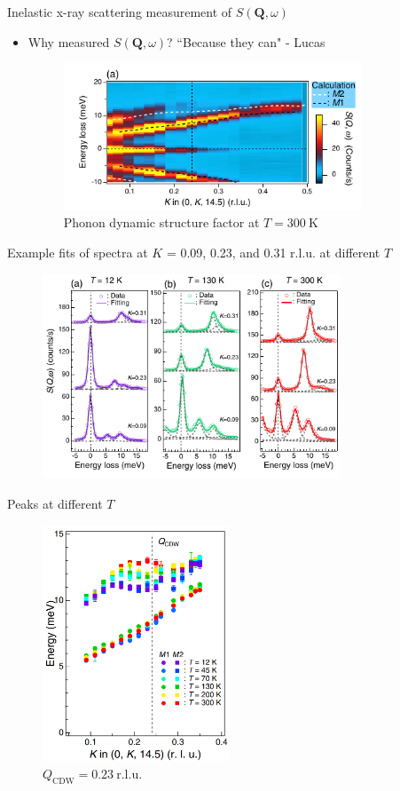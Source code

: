 \documentclass{beamer}
\newcommand*\vf[1]{\mathbf{#1}}
\begin{document}
\begin{frame}{Inelastic x-ray scattering measurement of $S(\vf{Q}, \omega)$}
\begin{itemize}
\item Why measured $S(\vf{Q}, \omega)$? ``Because they can" - Lucas
\begin{figure}
\includegraphics[width=3.5in]{figs/exp_sq.pdf}
\caption{\label{fig:exp_sq} Phonon dynamic structure factor at $T = 300~\mathrm{K}$}
\end{figure}
\end{itemize}
\end{frame}

\begin{frame}{Example fits of spectra at $K$ = 0.09, 0.23, and 0.31 r.l.u. at different $T$}
\begin{figure}
\includegraphics[width=3.5in]{figs/exp_fit.pdf}
\caption{\label{fig:exp_fit} }
\end{figure}
\end{frame}

\begin{frame}{Peaks at different $T$}
\begin{figure}
\includegraphics[width=2.2in]{figs/exp_E_k.png}
\caption{\label{fig:exp_E_k} $Q_{\text{CDW}} = 0.23~\mathrm{r.l.u.}$}
\end{figure}
\end{frame}
\end{document}

